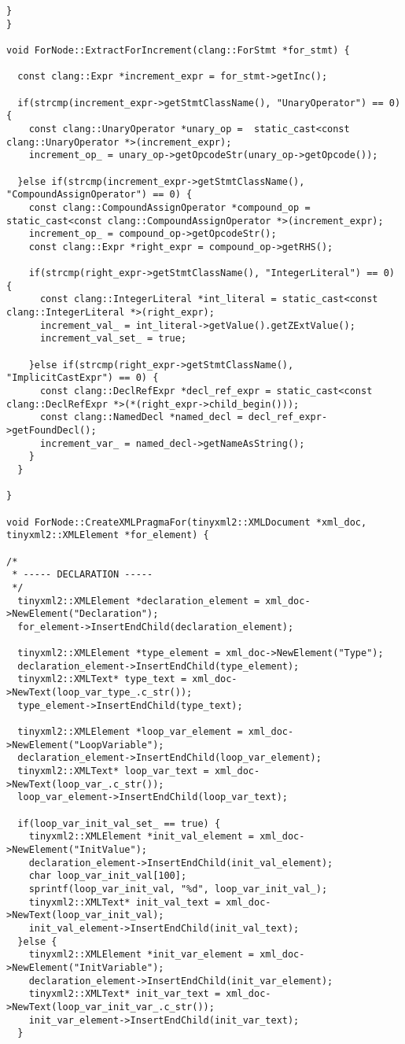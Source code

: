 \documentclass[a4paper,11pt,twoside]{book}
\begin{document}
\begin{lstlisting}[language=CCC, caption=pragma\_handler/ForNode.cpp]
  }
}

void ForNode::ExtractForIncrement(clang::ForStmt *for_stmt) {
  
  const clang::Expr *increment_expr = for_stmt->getInc();

  if(strcmp(increment_expr->getStmtClassName(), "UnaryOperator") == 0) {
    const clang::UnaryOperator *unary_op =  static_cast<const clang::UnaryOperator *>(increment_expr);
    increment_op_ = unary_op->getOpcodeStr(unary_op->getOpcode());

  }else if(strcmp(increment_expr->getStmtClassName(), "CompoundAssignOperator") == 0) {
    const clang::CompoundAssignOperator *compound_op = static_cast<const clang::CompoundAssignOperator *>(increment_expr);
    increment_op_ = compound_op->getOpcodeStr();
    const clang::Expr *right_expr = compound_op->getRHS();

    if(strcmp(right_expr->getStmtClassName(), "IntegerLiteral") == 0) {
      const clang::IntegerLiteral *int_literal = static_cast<const clang::IntegerLiteral *>(right_expr);
      increment_val_ = int_literal->getValue().getZExtValue();
      increment_val_set_ = true;

    }else if(strcmp(right_expr->getStmtClassName(), "ImplicitCastExpr") == 0) {
      const clang::DeclRefExpr *decl_ref_expr = static_cast<const clang::DeclRefExpr *>(*(right_expr->child_begin()));
      const clang::NamedDecl *named_decl = decl_ref_expr->getFoundDecl();
      increment_var_ = named_decl->getNameAsString();  
    }
  }

}

void ForNode::CreateXMLPragmaFor(tinyxml2::XMLDocument *xml_doc, tinyxml2::XMLElement *for_element) {

/*
 * ----- DECLARATION -----
 */ 
  tinyxml2::XMLElement *declaration_element = xml_doc->NewElement("Declaration");
  for_element->InsertEndChild(declaration_element);

  tinyxml2::XMLElement *type_element = xml_doc->NewElement("Type");
  declaration_element->InsertEndChild(type_element);
  tinyxml2::XMLText* type_text = xml_doc->NewText(loop_var_type_.c_str());
  type_element->InsertEndChild(type_text);

  tinyxml2::XMLElement *loop_var_element = xml_doc->NewElement("LoopVariable");
  declaration_element->InsertEndChild(loop_var_element);
  tinyxml2::XMLText* loop_var_text = xml_doc->NewText(loop_var_.c_str());
  loop_var_element->InsertEndChild(loop_var_text);

  if(loop_var_init_val_set_ == true) {
    tinyxml2::XMLElement *init_val_element = xml_doc->NewElement("InitValue");
    declaration_element->InsertEndChild(init_val_element);
    char loop_var_init_val[100];
    sprintf(loop_var_init_val, "%d", loop_var_init_val_);
    tinyxml2::XMLText* init_val_text = xml_doc->NewText(loop_var_init_val);
    init_val_element->InsertEndChild(init_val_text);
  }else {
    tinyxml2::XMLElement *init_var_element = xml_doc->NewElement("InitVariable");
    declaration_element->InsertEndChild(init_var_element);
    tinyxml2::XMLText* init_var_text = xml_doc->NewText(loop_var_init_var_.c_str());
    init_var_element->InsertEndChild(init_var_text);
  }


\end{lstlisting}
\end{document}
